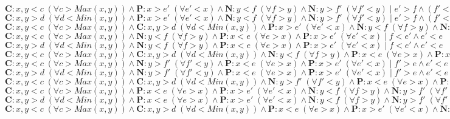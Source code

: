 \documentclass[a4paper]{article}
\begin{document}
\begin{landscape}
\noindent$\mathbf{C}:x,y<c\; (\forall c>Max(x,y))\wedge \mathbf{P}:x>e'\; (\forall e'<x)\wedge \mathbf{N}:y<f\; (\forall f>y) \wedge \mathbf{N}:y>f'\; (\forall f'<y)\;|\; e'>f\wedge (f'<f)$\\
$\mathbf{C}:x,y>d\; (\forall d<Min(x,y))\wedge \mathbf{P}:x>e'\; (\forall e'<x)\wedge \mathbf{N}:y<f\; (\forall f>y) \wedge \mathbf{N}:y>f'\; (\forall f'<y)\;|\; e'>f\wedge (f'<f)$\\
$\mathbf{C}:x,y<c\; (\forall c>Max(x,y))\wedge \mathbf{C}:x,y>d\; (\forall d<Min(x,y))\wedge \mathbf{P}:x>e'\; (\forall e'<x)\wedge \mathbf{N}:y<f\; (\forall f>y) \wedge \mathbf{N}:y>f'\; (\forall f'<y)\;|\; e'>f\wedge (f'<f)$\\

\noindent$\mathbf{C}:x,y<c\; (\forall c>Max(x,y))\wedge \mathbf{N}:y<f\; (\forall f>y)\wedge \mathbf{P}:x<e\; (\forall e>x) \wedge \mathbf{P}:x>e'\; (\forall e'<x)\;|\; f<e'\wedge e'<e$\\
$\mathbf{C}:x,y>d\; (\forall d<Min(x,y))\wedge \mathbf{N}:y<f\; (\forall f>y)\wedge \mathbf{P}:x<e\; (\forall e>x) \wedge \mathbf{P}:x>e'\; (\forall e'<x)\;|\; f<e'\wedge e'<e$\\
$\mathbf{C}:x,y<c\; (\forall c>Max(x,y))\wedge \mathbf{C}:x,y>d\; (\forall d<Min(x,y))\wedge \mathbf{N}:y<f\; (\forall f>y)\wedge \mathbf{P}:x<e\; (\forall e>x) \wedge \mathbf{P}:x>e'\; (\forall e'<x)\;|\; f<e'\wedge e'<e$\\


\noindent$\mathbf{C}:x,y<c\; (\forall c>Max(x,y))\wedge \mathbf{N}:y>f'\; (\forall f'<y)\wedge \mathbf{P}:x<e\; (\forall e>x) \wedge \mathbf{P}:x>e'\; (\forall e'<x)\;|\; f'>e\wedge e'<e$\\
$\mathbf{C}:x,y>d\; (\forall d<Min(x,y))\wedge \mathbf{N}:y>f'\; (\forall f'<y)\wedge \mathbf{P}:x<e\; (\forall e>x) \wedge \mathbf{P}:x>e'\; (\forall e'<x)\;|\; f'>e\wedge e'<e$\\
$\mathbf{C}:x,y<c\; (\forall c>Max(x,y))\wedge \mathbf{C}:x,y>d\; (\forall d<Min(x,y))\wedge \mathbf{N}:y>f'\; (\forall f'<y)\wedge \mathbf{P}:x<e\; (\forall e>x) \wedge \mathbf{P}:x>e'\; (\forall e'<x)\;|\; f'>e\wedge e'<e$\\

\noindent$\mathbf{C}:x,y<c\; (\forall c>Max(x,y))\wedge \mathbf{P}:x<e\; (\forall e>x)\wedge \mathbf{P}:x>e'\; (\forall e'<x)\wedge \mathbf{N}:y<f\; (\forall f>y) \wedge \mathbf{N}:y>f'\; (\forall f'<y)\;|\; e'<e\wedge f'<f\wedge (f<e'\vee e<f')$\\
$\mathbf{C}:x,y>d\; (\forall d<Min(x,y))\wedge \mathbf{P}:x<e\; (\forall e>x)\wedge \mathbf{P}:x>e'\; (\forall e'<x)\wedge \mathbf{N}:y<f\; (\forall f>y) \wedge \mathbf{N}:y>f'\; (\forall f'<y)\;|\; e'<e\wedge f'<f\wedge (f<e'\vee e<f')$\\
$\mathbf{C}:x,y<c\; (\forall c>Max(x,y))\wedge \mathbf{C}:x,y>d\; (\forall d<Min(x,y))\wedge \mathbf{P}:x<e\; (\forall e>x)\wedge \mathbf{P}:x>e'\; (\forall e'<x)\wedge \mathbf{N}:y<f\; (\forall f>y) \wedge \mathbf{N}:y>f'\; (\forall f'<y)\;|\; e'<e\wedge f'<f\wedge (f<e'\vee e<f')$\\

\end{landscape}
\end{document}
